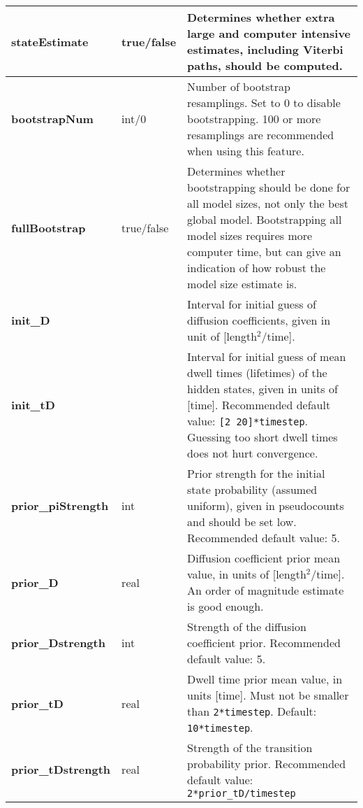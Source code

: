 \begin{longtable}{|m{}|>{\centering\arraybackslash}m{}|m{}|}
\textbf{stateEstimate}				&	  true/false						&		Determines whether extra large and computer intensive estimates, including Viterbi paths, should be computed.\\[0.5ex]  \hline 
\textbf{bootstrapNum}			&	  int/0							&		Number of bootstrap resamplings. Set to 0 to disable bootstrapping. 100 or more resamplings are recommended when using this feature.\\ [0.5ex]  \hline 
\textbf{fullBootstrap}				&	  true/false						&		Determines whether bootstrapping should be done for all model sizes, not only the best global model. Bootstrapping all model sizes requires more computer time, but can give an indication of how robust the model size estimate is.\\[0.5ex]  \hline 
\textbf{init\_D	}						&	  [real real]					&		Interval for initial guess of diffusion coefficients, given in unit of [length$^2$/time]. \\ [0.5ex]  \hline 
\textbf{init\_tD}						&	  [real real]					&		Interval for initial guess of mean dwell times (lifetimes) of the hidden states, given in units of [time]. Recommended default value: \mbox{\texttt{[2 20]*timestep}}. Guessing too short dwell times does not hurt convergence.\\ [0.5ex]  \hline 
\textbf{prior\_piStrength}		&	  int									&		Prior strength for the initial state probability (assumed uniform), given in pseudocounts and should be set low. Recommended default value: 5.\\ [0.5ex]  \hline 
\textbf{prior\_D}						&	  real								&		Diffusion coefficient prior mean value, in units of  [length$^2$/time]. An order of magnitude estimate is good enough.\\ [0.5ex]  \hline 
\textbf{prior\_Dstrength}			&	  int									&		Strength of the diffusion coefficient prior. Recommended default value: 5.\\ [0.5ex]  \hline 
\textbf{prior\_tD}						&	  real					&		Dwell time prior mean value, in units [time]. Must not be smaller than \texttt{2*timestep}. Default: \texttt{10*timestep}. \\ [0.5ex]  \hline 
\textbf{prior\_tDstrength}		&	  real		&		Strength of the transition probability prior. Recommended default value: \texttt{2*prior\_tD/timestep}\\ [1ex] %
\end{longtable}


\newpage

